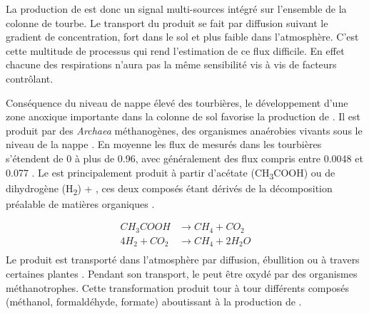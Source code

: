 La production de \coo est donc un signal multi-sources intégré sur l'ensemble de la colonne de tourbe.
Le transport du \coo produit se fait par diffusion suivant le gradient de concentration, fort dans le sol et plus faible dans l'atmosphère.
C'est cette multitude de processus qui rend l'estimation de ce flux difficile.
En effet chacune des respirations n'aura pas la même sensibilité vis à vis de facteurs contrôlant.




Conséquence du niveau de nappe élevé des tourbières, le développement d'une zone anoxique importante dans la colonne de sol favorise la production de \chh.
Il est produit par des \textit{Archaea} méthanogènes, des organismes anaérobies vivants sous le niveau de la nappe \citep{garcia2000}.
En moyenne les flux de \chh mesurés dans les tourbières s'étendent de 0 à plus de \SI{0.96}{\uml}, avec généralement des flux compris entre \num{0.0048} et \SI{0.077}{\uml} \citep{blodau2002}.
Le \chh est principalement produit à partir d'acétate (CH\textsubscript{3}COOH) ou de dihydrogène (H\textsubscript{2}) + \coo, ces deux composés étant dérivés de la décomposition préalable de matières organiques \citep{lai2009}.

$$\begin{aligned}
CH_{3}COOH  &\rightarrow CH_{4} + CO_{2}\\
4H_{2} + CO_{2} &\rightarrow CH_{4} + 2H_{2}O\\
\end{aligned} $$
Le \chh produit est transporté dans l'atmosphère par diffusion, ébullition ou à travers certaines plantes \citep{joabsson1999,colmer2003}.
Pendant son transport, le \chh peut être oxydé par des organismes méthanotrophes.
Cette transformation produit tour à tour différents composés (méthanol, formaldéhyde, formate) aboutissant à la production de \coo \citep{whalen2005}.

